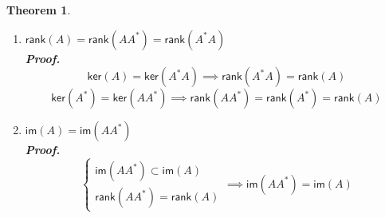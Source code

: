 \documentclass[aps,pra,onecolumn,notitlepage,superscriptaddress]{revtex4-1}
\newcommand{\rank}{\mathsf{rank}}
\newcommand{\im}{\mathsf{im}}
\newcommand{\myker}{\mathsf{ker}}
\newtheorem{theo}{Theorem}
\def\Proof{{\bf Proof.~}}
\begin{document}
\begin{theo}
\begin{enumerate}
{\begin{equation}
                \end{equation}
                \begin{equation}
                    Au = 0 \implies A^*Au = A^*0 = 0
                \end{equation}
            }
            \item $\rank(A) = \rank(AA^*) = \rank(A^*A)$
            \\\Proof{
                \begin{equation}
                    \myker(A) = \myker(A^*A) \implies \rank(A^*A) = \rank(A)
                \end{equation} 
                \begin{equation}
                    \myker(A^*) = \myker(AA^*) \implies \rank(AA^*) = \rank(A^*) = \rank(A)
                \end{equation}
            } 
            \item $\im(A) = \im(AA^*)$
            \\\Proof {
                \begin{equation}
                    \begin{cases}
                        \im(AA^*) \subset \im(A) \\
                        \rank(AA^*) = \rank(A)
                    \end{cases}
                    \implies \im(AA^*) = \im(A)
                \end{equation}
            }
        \end{enumerate}
    \end{theo}
\end{document}

